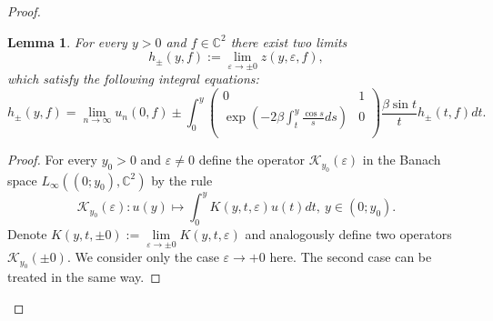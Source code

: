 \documentclass[a4paper,oneside,12pt]{amsart}
\newtheorem{lem}{Lemma}
\begin{document}
\begin{proof}
    \begin{lem}\label{lem convergence in the slow scale}
    For every $y>0$ and $f\in\mathbb C^2$ there exist two limits
    \begin{equation*}
        h_{\pm}(y,f):=\lim_{\varepsilon\rightarrow\pm0}z(y,\varepsilon,f),
    \end{equation*}
    which satisfy the following integral equations:
    \begin{equation}\label{equations for h-pm}
        h_{\pm}(y,f)=\lim_{n\rightarrow\infty}u_n(0,f)
        \pm\int_0^y
        \left(
          \begin{array}{cc}
            0 & 1 \\
            \exp\left(-2\beta\int_t^y\frac{\cos s}sds\right) & 0 \\
          \end{array}
        \right)
        \frac{\beta\sin t}th_{\pm}(t,f)dt.
    \end{equation}
    \end{lem}

\begin{proof}
For every $y_0>0$ and $\varepsilon\neq0$ define the operator $\mathcal K_{y_0}(\varepsilon)$ in the Banach space $L_{\infty}((0;y_0),\mathbb C^2)$ by the rule
\begin{equation}\label{K-y-0(epsilon)}
    \mathcal K_{y_0}(\varepsilon): u(y)\mapsto\int_0^yK(y,t,\varepsilon)u(t)dt,\ y\in(0;y_0).
\end{equation}
Denote $K(y,t,\pm0):=\lim\limits_{\varepsilon\rightarrow\pm0}K(y,t,\varepsilon)$ and analogously define two operators $\mathcal K_{y_0}(\pm0)$. We consider only the case $\varepsilon\rightarrow+0$ here. The second case can be treated in the same way.


\end{proof}
\end{proof}
\end{document}
